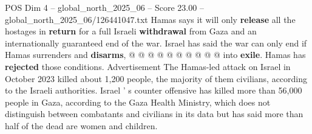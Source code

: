 \begin{textsample}{POS Dim 4 – global\_north\_2025\_06 – Score 23.00 – global\_north\_2025\_06/126441047.txt}
Hamas says it will only \textbf{release} all the hostages in \textbf{return} for a full Israeli \textbf{withdrawal} from Gaza and an internationally guaranteed end of the war.
Israel has said the war can only end if Hamas surrenders and \textbf{disarms}, @ @ @ @ @ @ @ @ @ @ into \textbf{exile}.
Hamas has \textbf{rejected} those conditions.
Advertisement The Hamas-led attack on Israel in October 2023 killed about 1,200 people, the majority of them civilians, according to the Israeli authorities.
Israel ' s counter offensive has killed more than 56,000 people in Gaza, according to the Gaza Health Ministry, which does not distinguish between combatants and civilians in its data but has said more than half of the dead are women and children.

\end{textsample}
